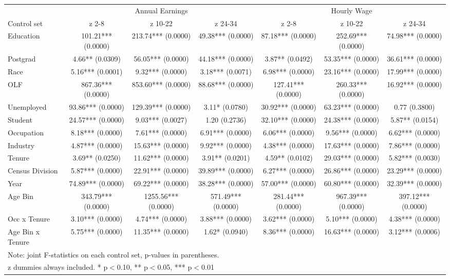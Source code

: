 \begin{tabular}{lccc|ccc}
\hline\hline
 & \multicolumn{3}{c|}{Annual Earnings} & \multicolumn{3}{c}{Hourly Wage} \\
Control set & z 2-8 & z 10-22 & z 24-34 & z 2-8 & z 10-22 & z 24-34 \\
\hline
Education&101.21*** (0.0000)&213.74*** (0.0000)&49.38*** (0.0000)&87.18*** (0.0000)&252.69*** (0.0000)&74.98*** (0.0000)\\
Postgrad&4.66** (0.0309)&56.05*** (0.0000)&44.18*** (0.0000)&3.87** (0.0492)&53.35*** (0.0000)&36.61*** (0.0000)\\
Race&5.16*** (0.0001)&9.32*** (0.0000)&3.18*** (0.0071)&6.98*** (0.0000)&23.16*** (0.0000)&17.99*** (0.0000)\\
OLF&867.36*** (0.0000)&853.60*** (0.0000)&88.68*** (0.0000)&127.41*** (0.0000)&260.33*** (0.0000)&16.92*** (0.0000)\\
Unemployed&93.86*** (0.0000)&129.39*** (0.0000)&3.11* (0.0780)&30.92*** (0.0000)&63.23*** (0.0000)&0.77 (0.3800)\\
Student&24.57*** (0.0000)&9.03*** (0.0027)&1.20 (0.2736)&32.10*** (0.0000)&24.38*** (0.0000)&5.87** (0.0154)\\
Occupation&8.18*** (0.0000)&7.61*** (0.0000)&6.91*** (0.0000)&6.06*** (0.0000)&9.56*** (0.0000)&6.62*** (0.0000)\\
Industry&4.87*** (0.0000)&15.63*** (0.0000)&9.92*** (0.0000)&4.38*** (0.0000)&17.63*** (0.0000)&7.86*** (0.0000)\\
Tenure&3.69** (0.0250)&11.62*** (0.0000)&3.91** (0.0201)&4.59** (0.0102)&29.03*** (0.0000)&5.82*** (0.0030)\\
Census Division&5.87*** (0.0000)&22.91*** (0.0000)&39.89*** (0.0000)&6.27*** (0.0000)&26.86*** (0.0000)&23.29*** (0.0000)\\
Year&74.89*** (0.0000)&69.22*** (0.0000)&38.28*** (0.0000)&57.00*** (0.0000)&60.80*** (0.0000)&32.39*** (0.0000)\\
Age Bin&343.79*** (0.0000)&1255.56*** (0.0000)&571.49*** (0.0000)&281.44*** (0.0000)&967.39*** (0.0000)&397.12*** (0.0000)\\
Occ x Tenure&3.10*** (0.0000)&4.74*** (0.0000)&3.88*** (0.0000)&3.62*** (0.0000)&5.10*** (0.0000)&4.38*** (0.0000)\\
Age Bin x Tenure&5.75*** (0.0000)&11.35*** (0.0000)&1.62* (0.0940)&8.36*** (0.0000)&16.63*** (0.0000)&3.12*** (0.0006)\\
\hline
\multicolumn{7}{l}{\footnotesize Note: joint F-statistics on each control set, p-values in parentheses.} \\
\multicolumn{7}{l}{\footnotesize z dummies always included. * p$<$0.10, ** p$<$0.05, *** p$<$0.01} \\
\hline\hline
\end{tabular}
